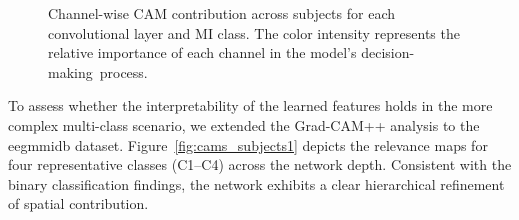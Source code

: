 \begin{figure}[H]
{\begin{minipage}[c]{0.90\textwidth}

    \end{minipage}%
  }
  \caption{Channel-wise CAM contribution across subjects for each convolutional layer and MI class. The color intensity represents the relative importance of each channel in the model's decision-\mbox{making process}.}
  \label{fig:cams_subjects}
\end{figure}

To assess whether the interpretability of the learned features holds in the more complex multi-class scenario, we extended the Grad-CAM++ analysis to the \gls{eegmmidb} dataset. Figure~\ref{fig:cams_subjects1} depicts the relevance maps for four representative classes (C1--C4) across the network depth. Consistent with the binary classification findings, the network exhibits a clear hierarchical refinement of spatial contribution. 


